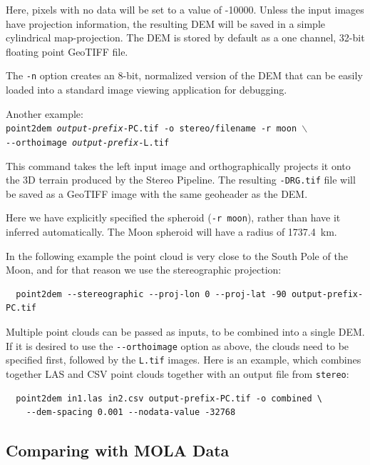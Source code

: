 Here, pixels with no data will be set to a value of -10000. Unless the input
images have projection information, the resulting \ac{DEM} will be saved
in a simple cylindrical map-projection.  The \ac{DEM} is
stored by default as a one channel, 32-bit floating point GeoTIFF file.

The {\tt -n} option creates an 8-bit, normalized version of the DEM
that can be easily loaded into a standard image viewing application
for debugging.

Another example: \\
\hspace*{2em}\texttt{point2dem \textit{output-prefix}-PC.tif -o stereo/filename -r moon $\backslash$} \\
\hspace*{4em}\texttt{-\/-orthoimage \textit{output-prefix}-L.tif}

This command takes the left input image and orthographically projects
it onto the 3D terrain produced by the Stereo Pipeline.  The resulting
{\tt *-DRG.tif} file will be saved as a GeoTIFF image with the same
geoheader as the DEM.

Here we have explicitly specified the spheroid (\texttt{-r moon}), rather
than have it inferred automatically. The Moon spheroid will have
a radius of 1737.4~km.

In the following example the point cloud is very close to the
South Pole of the Moon, and for that reason we use the stereographic projection:
\begin{verbatim}
  point2dem --stereographic --proj-lon 0 --proj-lat -90 output-prefix-PC.tif
\end{verbatim}

Multiple point clouds can be passed as inputs, to be combined into a
single \ac{DEM}. If it is desired to use the \texttt{-\/-orthoimage}
option as above, the clouds need to be specified first, followed by the
\texttt{L.tif} images. Here is an example, which combines together LAS
and CSV point clouds together with an output file from {\tt stereo}:
\begin{verbatim}
  point2dem in1.las in2.csv output-prefix-PC.tif -o combined \
    --dem-spacing 0.001 --nodata-value -32768
\end{verbatim}

\subsection{Comparing with MOLA Data}
\label{molacmp}

